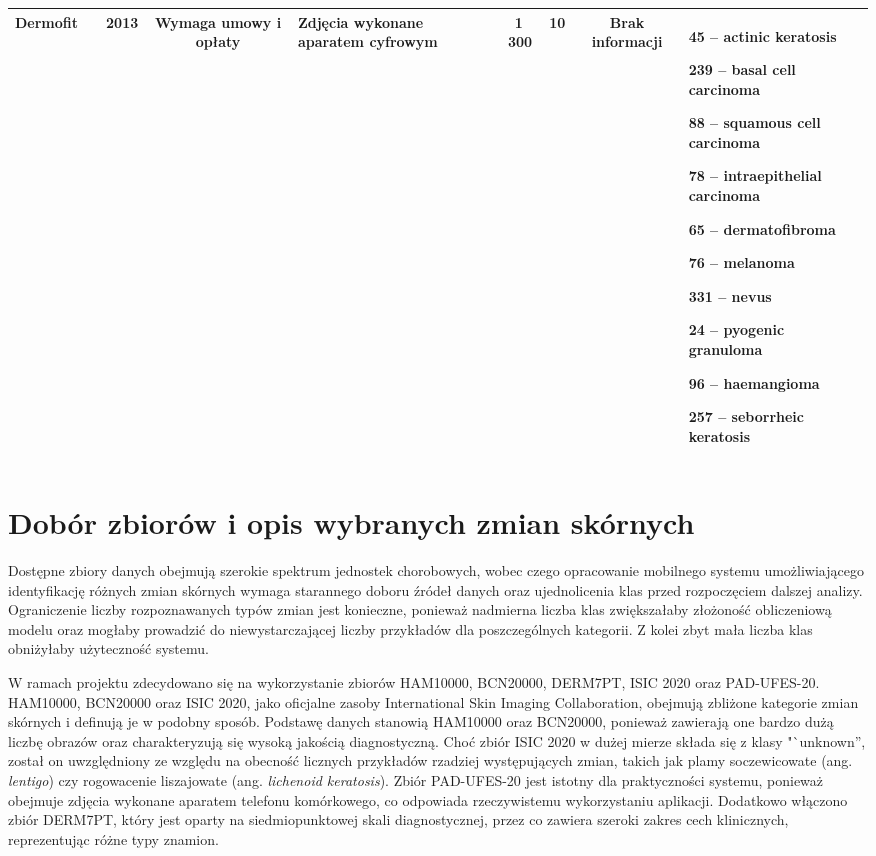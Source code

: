 \begin{table}
\begin{tabular}{|c|c|c|c|p{2cm}|c|c|c|p{3cm}|}
		Dermofit & \cite{Dermofit, inbook} & 2013 & Wymaga umowy i opłaty & Zdjęcia wykonane aparatem cyfrowym & 1\,300 & 10 & Brak informacji &
		45 – actinic keratosis
		
		239 – basal cell carcinoma
		
		88 – squamous cell carcinoma
		
		78 – intraepithelial carcinoma
		
		65 – dermatofibroma
		
		76 – melanoma
		
		331 – nevus
		
		24 – pyogenic granuloma
		
		96 – haemangioma
		
		257 – seborrheic keratosis \\ \hline

	\end{tabular}
\end{table}


\section{Dobór zbiorów i opis wybranych zmian skórnych}
Dostępne zbiory danych obejmują szerokie spektrum jednostek chorobowych, wobec czego opracowanie mobilnego systemu umożliwiającego identyfikację różnych zmian skórnych wymaga starannego doboru źródeł danych oraz ujednolicenia klas przed rozpoczęciem dalszej analizy.
Ograniczenie liczby rozpoznawanych typów zmian jest konieczne, ponieważ nadmierna liczba klas zwiększałaby złożoność obliczeniową modelu oraz mogłaby prowadzić do niewystarczającej liczby przykładów dla poszczególnych kategorii.
Z kolei zbyt mała liczba klas obniżyłaby użyteczność systemu.

W ramach projektu zdecydowano się na wykorzystanie zbiorów HAM10000, BCN20000, DERM7PT, ISIC 2020 oraz PAD-UFES-20.
HAM10000, BCN20000 oraz ISIC 2020, jako oficjalne zasoby International Skin Imaging Collaboration, obejmują zbliżone kategorie zmian skórnych i definują je w podobny sposób.
Podstawę danych stanowią HAM10000 oraz BCN20000, ponieważ zawierają one bardzo dużą liczbę obrazów oraz charakteryzują się wysoką jakością diagnostyczną.
Choć zbiór ISIC 2020 w dużej mierze składa się z klasy "`unknown'', został on uwzględniony ze względu na obecność licznych przykładów rzadziej występujących zmian, takich jak plamy soczewicowate (ang. \textit{lentigo}) czy rogowacenie liszajowate (ang. \textit{lichenoid keratosis}).
Zbiór PAD-UFES-20 jest istotny dla praktyczności systemu, ponieważ obejmuje zdjęcia wykonane aparatem telefonu komórkowego, co odpowiada rzeczywistemu wykorzystaniu aplikacji.
Dodatkowo włączono zbiór DERM7PT, który jest oparty na siedmiopunktowej skali diagnostycznej, przez co zawiera szeroki zakres cech klinicznych, reprezentując różne typy znamion.

